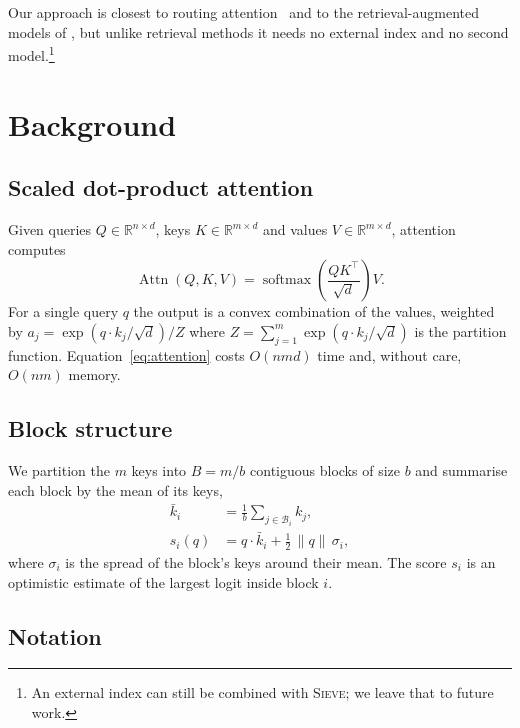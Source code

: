 \documentclass[11pt]{article}
\newcommand{\R}{\mathbb{R}}
\newcommand{\norm}[1]{\lVert #1 \rVert}
\newcommand{\softmax}{\operatorname{softmax}}
\theoremstyle{definition}
\begin{document}
Our approach is closest to routing attention~\citep{roy2021efficient} and to
the retrieval-augmented models of \citet{borgeaud2022improving}, but unlike
retrieval methods it needs no external index and no second model.\footnote{An
external index can still be combined with \textsc{Sieve}; we leave that to
future work.}

\section{Background}
\label{sec:background}

\subsection{Scaled dot-product attention}

Given queries $Q \in \R^{n \times d}$, keys $K \in \R^{m \times d}$ and values
$V \in \R^{m \times d}$, attention computes
\begin{equation}
  \operatorname{Attn}(Q, K, V) = \softmax\!\left(\frac{QK^\top}{\sqrt{d}}\right) V .
  \label{eq:attention}
\end{equation}
For a single query $q$ the output is a convex combination of the values,
weighted by $a_j = \exp(q \cdot k_j / \sqrt{d}) / Z$ where
$Z = \sum_{j=1}^{m} \exp(q \cdot k_j / \sqrt{d})$ is the partition function.
Equation~\eqref{eq:attention} costs $O(nmd)$ time and, without care,
$O(nm)$ memory.

\subsection{Block structure}

We partition the $m$ keys into $B = m / b$ contiguous blocks of size $b$ and
summarise each block by the mean of its keys,
\begin{align}
  \bar{k}_i &= \frac{1}{b} \sum_{j \in \mathcal{B}_i} k_j, \label{eq:summary}\\
  s_i(q)    &= q \cdot \bar{k}_i + \tfrac{1}{2}\, \norm{q}\, \sigma_i , \nonumber
\end{align}
where $\sigma_i$ is the spread of the block's keys around their mean. The score
$s_i$ is an optimistic estimate of the largest logit inside block $i$.

\subsection*{Notation}
\end{document}
